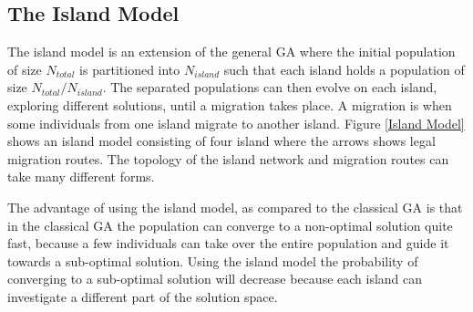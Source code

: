 \documentclass{article}
\begin{document}
%
%


\subsection{The Island Model}
The island model is an extension of the general GA where the initial population of size $N_{total}$ is partitioned into $N_{island}$ such that each island holds a population of size $N_{total} / N_{island}$. The separated populations can then evolve on each island, exploring different solutions, until a migration takes place. A migration is when some individuals from one island migrate to another island. Figure \ref{Island Model} shows an island model consisting of four island where the arrows shows legal migration routes. The topology of the island network and migration routes can take many different forms. 

The advantage of using the island model, as compared to the classical GA is that in the classical GA the population can converge to a non-optimal solution quite fast, because a few individuals can take over the entire population and guide it towards a sub-optimal solution. Using the island model the probability of converging to a sub-optimal solution will decrease because each island can investigate a different part of the solution space. 
\end{document}
